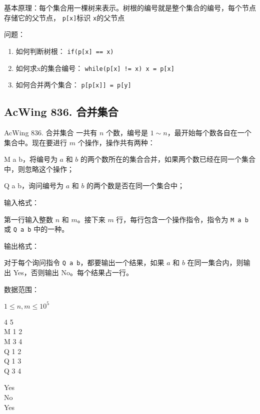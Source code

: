 基本原理：每个集合用一棵树来表示。树根的编号就是整个集合的编号，每个节点存储它的父节点， \lstinline{p[x]}标识 \lstinline{x}的父节点

问题：

\begin{enumerate}
    \item 如何判断树根： \lstinline{if(p[x] == x)}
    \item 如何求x的集合编号： \lstinline{while(p[x] != x) x = p[x]}
    \item 如何合并两个集合： \lstinline{p[p[x]] = p[y]}
\end{enumerate}

\subsection{AcWing 836. 合并集合}

\begin{titledbox}{AcWing 836. 合并集合}
    一共有 $n$ 个数，编号是 $1 \sim n$，最开始每个数各自在一个集合中。现在要进行 $m$ 个操作，操作共有两种：

    M a b，将编号为 $a$ 和 $b$ 的两个数所在的集合合并，如果两个数已经在同一个集合中，则忽略这个操作；

    Q a b，询问编号为 $a$ 和 $b$ 的两个数是否在同一个集合中；

    输入格式：

    第一行输入整数 $n$ 和 $m$。接下来 $m$ 行，每行包含一个操作指令，指令为 \lstinline{M a b} 或 \lstinline{Q a b} 中的一种。

    输出格式：

    对于每个询问指令 \lstinline{Q a b}，都要输出一个结果，如果 $a$ 和 $b$ 在同一集合内，则输出 Yes，否则输出 No。每个结果占一行。

    数据范围：

    $1 \le n,m \le 10^5$

    \begin{inputblock}
        4 5 \\
        M 1 2 \\
        M 3 4 \\
        Q 1 2 \\
        Q 1 3 \\
        Q 3 4
    \end{inputblock}
    \begin{outputblock}
        Yes \\
        No \\
        Yes
    \end{outputblock}
\end{titledbox}

